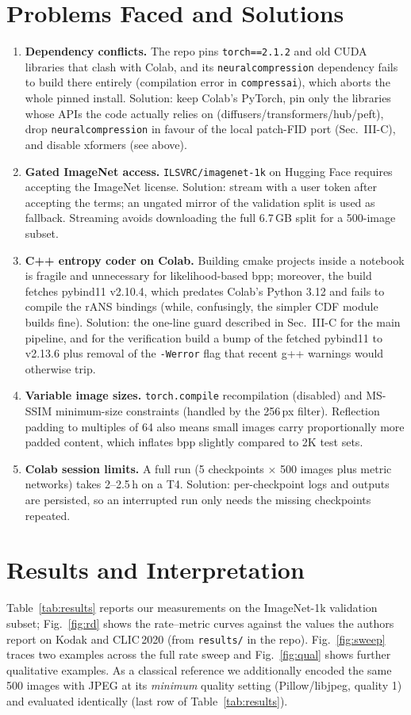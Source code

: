 \documentclass[conference]{IEEEtran}
\begin{document}
\section{Problems Faced and Solutions}
\begin{enumerate}
\item \textbf{Dependency conflicts.} The repo pins \texttt{torch==2.1.2} and old CUDA libraries
that clash with Colab, and its \texttt{neuralcompression} dependency fails to build there
entirely (compilation error in \texttt{compressai}), which aborts the whole pinned install.
Solution: keep Colab's PyTorch, pin only the libraries whose APIs the code actually relies on
(diffusers/transformers/hub/peft), drop \texttt{neuralcompression} in favour of the local
patch-FID port (Sec.~III-C), and disable xformers (see above).
\item \textbf{Gated ImageNet access.} \texttt{ILSVRC/imagenet-1k} on Hugging Face requires
accepting the ImageNet license. Solution: stream with a user token after accepting the terms; an
ungated mirror of the validation split is used as fallback. Streaming avoids downloading the full
6.7\,GB split for a 500-image subset.
\item \textbf{C++ entropy coder on Colab.} Building cmake projects inside a notebook is fragile
and unnecessary for likelihood-based bpp; moreover, the build fetches pybind11 v2.10.4, which
predates Colab's Python 3.12 and fails to compile the rANS bindings (while, confusingly, the
simpler CDF module builds fine). Solution: the one-line guard described in Sec.~III-C for the
main pipeline, and for the verification build a bump of the fetched pybind11 to v2.13.6 plus
removal of the \texttt{-Werror} flag that recent g++ warnings would otherwise trip.
\item \textbf{Variable image sizes.} \texttt{torch.compile} recompilation (disabled) and MS-SSIM
minimum-size constraints (handled by the 256\,px filter). Reflection padding to multiples of 64
also means small images carry proportionally more padded content, which inflates bpp slightly
compared to 2K test sets.
\item \textbf{Colab session limits.} A full run (5 checkpoints $\times$ 500 images plus metric
networks) takes 2--2.5\,h on a T4. Solution: per-checkpoint logs and outputs are persisted, so an
interrupted run only needs the missing checkpoints repeated.
\end{enumerate}

\section{Results and Interpretation}
Table~\ref{tab:results} reports our measurements on the ImageNet-1k validation subset;
Fig.~\ref{fig:rd} shows the rate--metric curves against the values the authors report on Kodak
and CLIC\,2020 (from \texttt{results/} in the repo). Fig.~\ref{fig:sweep} traces two examples
across the full rate sweep and Fig.~\ref{fig:qual} shows further qualitative examples. As a
classical reference we additionally encoded the same 500 images with JPEG at its \emph{minimum}
quality setting (Pillow/libjpeg, quality 1) and evaluated identically (last row of
Table~\ref{tab:results}).
\end{document}
